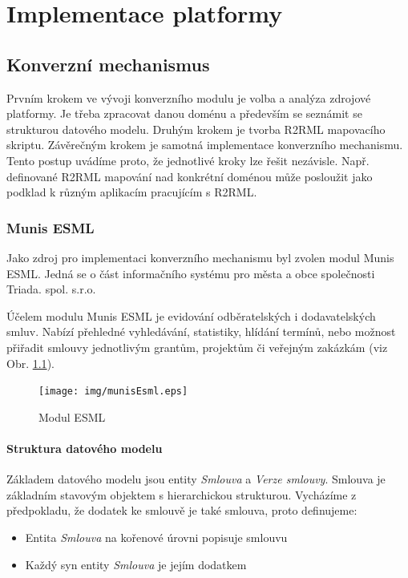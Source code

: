 \chapter{Implementace platformy}

\section{Konverzní mechanismus}

Prvním krokem ve vývoji konverzního modulu je volba a analýza zdrojové platformy. Je třeba zpracovat danou doménu a především se seznámit se strukturou datového modelu. Druhým krokem je tvorba R2RML mapovacího skriptu. Závěrečným krokem je samotná implementace konverzního mechanismu. Tento postup uvádíme proto, že jednotlivé kroky lze řešit nezávisle. Např. definované R2RML mapování nad konkrétní doménou může posloužit jako podklad k různým aplikacím pracujícím s R2RML. 

\subsection{Munis ESML}

Jako zdroj pro implementaci konverzního mechanismu byl zvolen modul Munis ESML. Jedná se o část informačního systému pro města a obce společnosti Triada. spol. s.r.o.

Účelem modulu Munis ESML je evidování odběratelských i dodavatelských smluv. Nabízí přehledné vyhledávání, statistiky, hlídání termínů, nebo možnost přiřadit smlouvy jednotlivým grantům, projektům či veřejným zakázkám (viz Obr. \ref{obr:munisEsml}).

\begin{figure}[H]
\centerline{\texttt{[image: img/munisEsml.eps]}}
\caption{Modul ESML}
\label{obr:munisEsml}
\end{figure}

\newpage

\subsubsection{Struktura datového modelu}

Základem datového modelu jsou entity \textit{Smlouva} a \textit{Verze smlouvy}. Smlouva je základním stavovým objektem s hierarchickou strukturou. Vycházíme z předpokladu, že dodatek ke smlouvě je také smlouva, proto definujeme:

\begin{itemize}
\item Entita \textit{Smlouva} na kořenové úrovni popisuje smlouvu
\item Každý syn entity \textit{Smlouva} je jejím dodatkem
\end{itemize}

